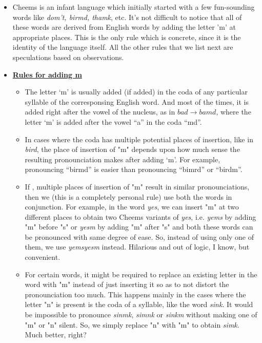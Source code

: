 \documentclass{article}
\begin{document}
\begin{itemize}
    \item Cheems is an infant language which initially started with a few fun-sounding words like \textit{dom't, birmd, thamk}, etc. It's not difficult to notice that all of these words are derived from English words by adding the letter 'm' at appropriate places. This is the only rule which is concrete, since it is the identity of the language itself. All the other rules that we list next are speculations based on observations.

    \item \underline{\textbf{Rules for adding m}}
          \begin{itemize}
              \item The letter `m' is usually added (if added) in the coda of any particular syllable of the corresponsing English word. And most of the times, it is added right after the vowel of the nucleus, as in $bad \to bamd$, where the letter `m' is added after the vowel ``a'' in the coda ``md''.
              \item In cases where the coda has multiple potential places of insertion, like in \textit{bird}, the place of insertion of "m" depends upon how much sense the resulting pronounciation makes after adding `m'. For example, pronouncing ``birmd'' is easier than pronouncing ``bimrd'' or ``birdm''.

              \item If , multiple places of insertion of "m" result in similar pronounciations, then we (this is a completely personal rule) use both the words in conjunction. For example, in the word \textit{yes}, we can insert "m" at two different places to obtain two Cheems variants of \textit{yes}, i.e. \textit{yems} by adding "m" before "s" or \textit{yesm} by adding "m" after "s" and both these words can be pronounced with same degree of ease. So, instead of using only one of them, we use \textit{yemsyesm} instead. Hilarious and out of logic, I know, but convenient.

              \item For certain words, it might be required to replace an existing letter in the word with "m" instead of just inserting it so as to not distort the pronounciation too much. This happens mainly in the cases where the letter "n" is present is the coda of a syllable, like the word \textit{sink}. It would be impossible to pronounce \textit{sinmk}, \textit{simnk} or \textit{sinkm} without making one of "m" or "n" silent. So, we simply replace "n" with "m" to obtain \textit{simk}. Much better, right?
          \end{itemize}
\end{itemize}
\end{document}
